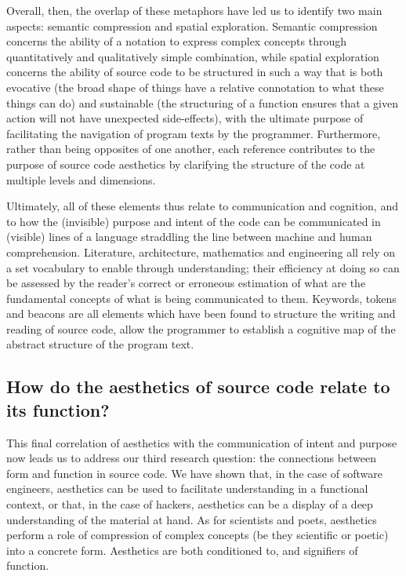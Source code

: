 Overall, then, the overlap of these metaphors have led us to identify two main aspects: semantic compression and spatial exploration. Semantic compression concerns the ability of a notation to express complex concepts through quantitatively and qualitatively simple combination, while spatial exploration concerns the ability of source code to be structured in such a way that is both evocative (the broad shape of things have a relative connotation to what these things can do) and sustainable (the structuring of a function ensures that a given action will not have unexpected side-effects), with the ultimate purpose of facilitating the navigation of program texts by the programmer. Furthermore, rather than being opposites of one another, each reference contributes to the purpose of source code aesthetics by clarifying the structure of the code at multiple levels and dimensions.

Ultimately, all of these elements thus relate to communication and cognition, and to how the (invisible) purpose and intent of the code can be communicated in (visible) lines of a language straddling the line between machine and human comprehension. Literature, architecture, mathematics and engineering all rely on a set vocabulary to enable through understanding; their efficiency at doing so can be assessed by the reader's correct or erroneous estimation of what are the fundamental concepts of what is being communicated to them. Keywords, tokens and beacons are all elements which have been found to structure the writing and reading of source code, allow the programmer to establish a cognitive map of the abstract structure of the program text.

\subsection*{How do the aesthetics of source code relate to its function?}
\label{subsec:conclusion-rq-3}

This final correlation of aesthetics with the communication of intent and purpose now leads us to address our third research question: the connections between form and function in source code. We have shown that, in the case of software engineers, aesthetics can be used to facilitate understanding in a functional context, or that, in the case of hackers, aesthetics can be a display of a deep understanding of the material at hand. As for scientists and poets, aesthetics perform a role of compression of complex concepts (be they scientific or poetic) into a concrete form. Aesthetics are both conditioned to, and signifiers of function.


